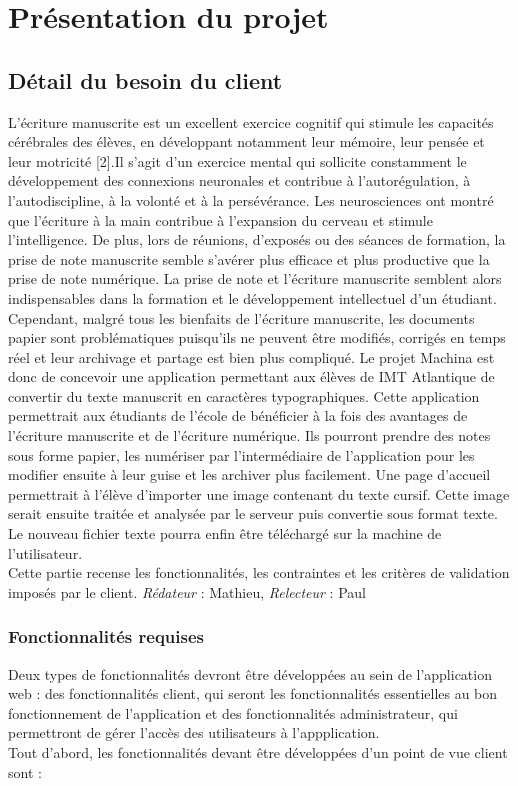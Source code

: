 \documentclass[oneside,a4paper,13pt]{article}
\begin{document}
\section{Présentation du projet}

\subsection{Détail du besoin du client}
L’écriture manuscrite est un excellent exercice cognitif qui stimule les capacités cérébrales des élèves, en développant notamment leur mémoire, leur pensée et leur motricité [2].Il s’agit d’un exercice mental qui sollicite constamment le développement des connexions neuronales et contribue à l’autorégulation, à l’autodiscipline, à la volonté et à la persévérance. Les neurosciences ont montré que l’écriture à la main contribue à l’expansion du cerveau et stimule l’intelligence. De plus, lors de réunions, d’exposés ou des séances de formation, la prise de note manuscrite semble s’avérer plus efficace et plus productive que la prise de note numérique. La prise de note et l’écriture manuscrite semblent alors indispensables dans la formation et le développement intellectuel d’un étudiant. Cependant, malgré tous les bienfaits de l’écriture manuscrite, les documents papier sont problématiques puisqu’ils ne peuvent être modifiés, corrigés en temps réel et leur archivage et partage est bien plus compliqué. \medbreak
Le projet Machina est donc de concevoir une application permettant aux élèves de IMT Atlantique de convertir du texte manuscrit en caractères typographiques. Cette application permettrait aux étudiants de l’école de bénéficier à la fois des avantages de l’écriture manuscrite et de l'écriture numérique. Ils pourront prendre des notes sous forme papier, les numériser par l’intermédiaire de l’application pour les modifier ensuite  à leur guise et les archiver plus facilement.\medbreak
Une page d’accueil permettrait à l’élève d’importer une image contenant du texte cursif. Cette image serait ensuite traitée et analysée par le serveur puis convertie sous format texte. Le nouveau fichier texte pourra enfin être téléchargé sur la machine de l’utilisateur. \\
Cette partie recense les fonctionnalités, les contraintes et les critères de validation imposés par le client. 
\smallbreak\textit{Rédateur} : Mathieu, \textit{Relecteur} : Paul 

\subsubsection{Fonctionnalités requises}
Deux types de fonctionnalités devront être développées au sein de l'application web : des fonctionnalités client, qui seront les fonctionnalités essentielles au bon fonctionnement de l'application et des fonctionnalités administrateur, qui permettront de gérer l'accès des utilisateurs à l'appplication. \\
Tout d’abord, les fonctionnalités devant être développées d’un point de vue client sont : 
\end{document}
